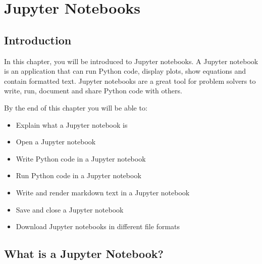 \documentclass{book}
\begin{document}
    




    
        \hypertarget{jupyter-notebooks}{%
\chapter{Jupyter Notebooks}\label{jupyter-notebooks}}
    




    
        \hypertarget{introduction}{%
\section{Introduction}\label{introduction}}
    




    
        In this chapter, you will be introduced to Jupyter notebooks. A Jupyter
notebook is an application that can run Python code, display plots, show
equations and contain formatted text. Jupyter notebooks are a great tool
for problem solvers to write, run, document and share Python code with
others.

By the end of this chapter you will be able to:

\begin{itemize}
\item
  Explain what a Jupyter notebook is
\item
  Open a Jupyter notebook
\item
  Write Python code in a Jupyter notebook
\item
  Run Python code in a Jupyter notebook
\item
  Write and render markdown text in a Jupyter notebook
\item
  Save and close a Jupyter notebook
\item
  Download Jupyter notebooks in different file formats
\end{itemize}
        \newpage

    




    
        \hypertarget{what-is-a-jupyter-notebook}{%
\section{What is a Jupyter Notebook?}\label{what-is-a-jupyter-notebook}}
    
\end{document}
